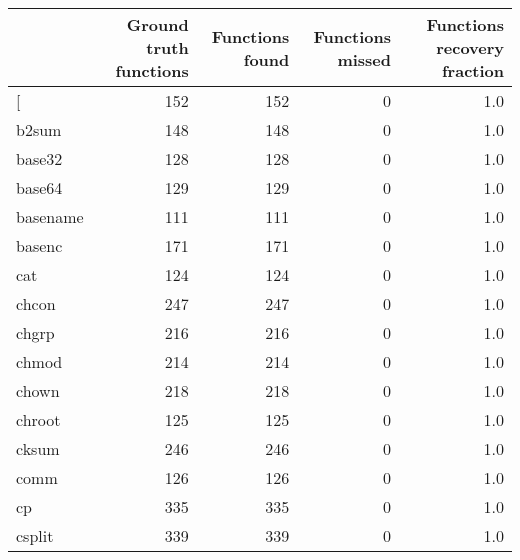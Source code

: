 \begin{tabular}{lrrrr}
\toprule
{} &  Ground truth functions &  Functions found &  Functions missed &  Functions recovery fraction \\
\midrule
[         &                     152 &              152 &                 0 &                          1.0 \\
b2sum     &                     148 &              148 &                 0 &                          1.0 \\
base32    &                     128 &              128 &                 0 &                          1.0 \\
base64    &                     129 &              129 &                 0 &                          1.0 \\
basename  &                     111 &              111 &                 0 &                          1.0 \\
basenc    &                     171 &              171 &                 0 &                          1.0 \\
cat       &                     124 &              124 &                 0 &                          1.0 \\
chcon     &                     247 &              247 &                 0 &                          1.0 \\
chgrp     &                     216 &              216 &                 0 &                          1.0 \\
chmod     &                     214 &              214 &                 0 &                          1.0 \\
chown     &                     218 &              218 &                 0 &                          1.0 \\
chroot    &                     125 &              125 &                 0 &                          1.0 \\
cksum     &                     246 &              246 &                 0 &                          1.0 \\
comm      &                     126 &              126 &                 0 &                          1.0 \\
cp        &                     335 &              335 &                 0 &                          1.0 \\
csplit    &                     339 &              339 &                 0 &                          1.0 \\

\end{tabular}
